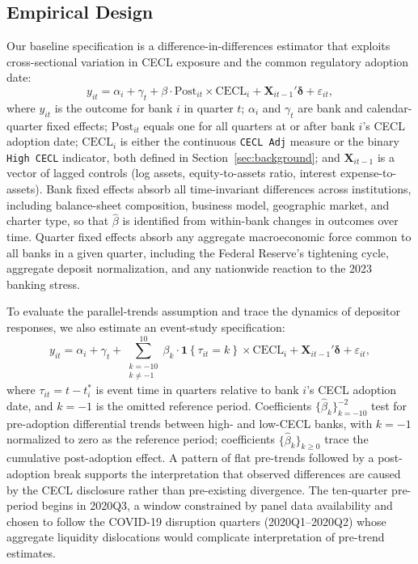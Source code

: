 \subsection{Empirical Design}
\label{sec:identification:did}

Our baseline specification is a difference-in-differences estimator that
exploits cross-sectional variation in CECL exposure and the common
regulatory adoption date:
\begin{equation}
  y_{it}
  = \alpha_i + \gamma_t
  + \beta \cdot \mathrm{Post}_{it} \times \mathrm{CECL}_i
  + \mathbf{X}_{it-1}'\boldsymbol{\delta}
  + \varepsilon_{it},
  \label{eq:did}
\end{equation}
where $y_{it}$ is the outcome for bank $i$ in quarter $t$; $\alpha_i$ and
$\gamma_t$ are bank and calendar-quarter fixed effects; $\mathrm{Post}_{it}$
equals one for all quarters at or after bank $i$'s CECL adoption date;
$\mathrm{CECL}_i$ is either the continuous \texttt{CECL Adj} measure or the
binary \texttt{High CECL} indicator, both defined in
Section~\ref{sec:background}; and $\mathbf{X}_{it-1}$ is a vector of lagged
controls (log assets, equity-to-assets ratio, interest expense-to-assets).
Bank fixed effects absorb all time-invariant differences across institutions,
including balance-sheet composition, business model, geographic market, and
charter type, so that $\hat{\beta}$ is identified from within-bank changes
in outcomes over time.  Quarter fixed effects absorb any aggregate
macroeconomic force common to all banks in a given quarter, including the
Federal Reserve's tightening cycle, aggregate deposit normalization, and any
nationwide reaction to the 2023 banking stress.

To evaluate the parallel-trends assumption and trace the dynamics of depositor
responses, we also estimate an event-study specification:
\begin{equation}
  y_{it}
  = \alpha_i + \gamma_t
  + \sum_{\substack{k=-10 \\ k \neq -1}}^{10}
    \beta_k \cdot \mathbf{1}\!\left\{\tau_{it} = k\right\}
    \times \mathrm{CECL}_i
  + \mathbf{X}_{it-1}'\boldsymbol{\delta}
  + \varepsilon_{it},
  \label{eq:eventstudy}
\end{equation}
where $\tau_{it} = t - t_i^{*}$ is event time in quarters relative to bank
$i$'s CECL adoption date, and $k = -1$ is the omitted reference period.
Coefficients $\{\hat{\beta}_k\}_{k=-10}^{-2}$ test for pre-adoption
differential trends between high- and low-CECL banks, with $k=-1$ normalized
to zero as the reference period; coefficients $\{\hat{\beta}_k\}_{k \geq 0}$
trace the cumulative post-adoption effect.  A pattern of flat pre-trends
followed by a post-adoption break supports the interpretation that observed
differences are caused by the CECL disclosure rather than pre-existing
divergence.  The ten-quarter pre-period begins in 2020Q3, a window
constrained by panel data availability and chosen to follow the COVID-19
disruption quarters (2020Q1--2020Q2) whose aggregate liquidity dislocations
would complicate interpretation of pre-trend estimates.


